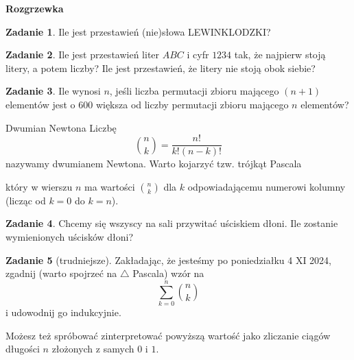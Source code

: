 \documentclass{uoom}
\theoremstyle{definition}
\newtheorem{zadd}{Zadanie}
\newenvironment{zadanie}{
  \begin{zadd}
  }
  {
    \end{zadd}\vspace{\ooodstep}
  }
\begin{document}
\noindent\makebox[\linewidth]{\rule{\textwidth}{0.4pt}}

\noindent\textbf{Rozgrzewka}

\begin{zadanie}
  Ile jest przestawień (nie)słowa LEWINKLODZKI?
\end{zadanie}

\begin{zadanie}
  Ile jest przestawień liter $ABC$ i cyfr $1234$ tak, że najpierw stoją litery, a potem liczby? Ile jest przestawień, że litery nie stoją obok siebie?
\end{zadanie}

\begin{zadanie}
  Ile wynosi $n$, jeśli liczba permutacji zbioru mającego $(n+1)$ elementów jest o $600$ większa od liczby permutacji zbioru mającego $n$ elementów?
\end{zadanie}


\noindent\makebox[\linewidth]{\rule{\textwidth}{0.4pt}}

\begin{mybox}{Dwumian Newtona}
  Liczbę
  $$\binom{n}{k}=\frac{n!}{k!(n-k)!}$$
  nazywamy dwumianem Newtona. Warto kojarzyć tzw. trójkąt Pascala
  \begin{center}
  \end{center}
  \medskip
  który w wierszu $n$ ma wartości $\binom{n}{k}$ dla $k$ odpowiadającemu numerowi kolumny (licząc od $k=0$ do $k=n$).
\end{mybox}

\begin{zadanie}
  Chcemy się wszyscy na sali przywitać uściskiem dłoni. Ile zostanie wymienionych uścisków dłoni?
\end{zadanie}

\begin{zadanie}[trudniejsze]
  Zakładając, że jesteśmy po poniedziałku 4 XI 2024, zgadnij (warto spojrzeć na $\triangle$ Pascala) wzór na
  $$\sum_{k=0}^n\binom{n}{k}$$
  i udowodnij go indukcyjnie.

  Możesz też spróbować zinterpretować powyższą wartość jako zliczanie ciągów długości $n$ złożonych z samych $0$ i $1$.
\end{zadanie}
\end{document}
